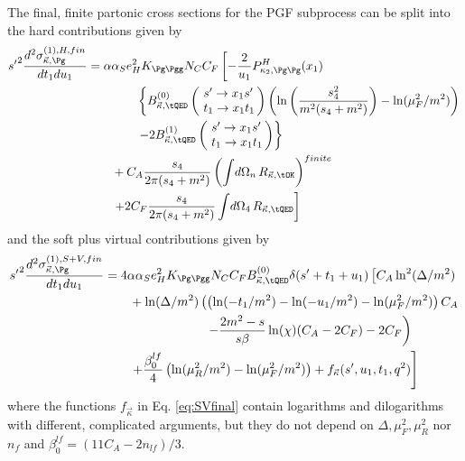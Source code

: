 The final, finite partonic cross sections for the PGF subprocess can be split into the hard contributions given by
\begin{align}
{s'}^2\frac{d^2\sigma_{\vec \kappa,\Pg}^{(1),H,fin}}{dt_1du_1} &=\alpha\alpha_Se_H^2K_{\Pg\Pgg}N_CC_F\left[-\frac 2 {u_1}P^H_{\kappa_2,\Pg\Pg}(x_1)\right. \nonumber\\
 &\hspace{40pt}\left\{ B^{(0)}_{\vec \kappa,\tQED}\left(\!\begin{array}{l}s'\rightarrow x_1s'\\t_1\rightarrow x_1 t_1\end{array}\!\!\right) \left(\ln\left(\frac{s_4^2}{m^2(s_4+m^2)}\right)-\ln(\mu_F^2/m^2)\right)\right. \nonumber\\
 &\hspace{40pt}\left.-2B^{(1)}_{\vec \kappa,\tQED}\left(\!\begin{array}{l}s'\rightarrow x_1s'\\t_1\rightarrow x_1 t_1\end{array}\!\!\right)\right\} \nonumber\\
 &\hspace{20pt}+C_A\frac{s_4}{2\pi(s_4+m^2)}\left(\int\!d\Omega_n\,R_{\vec \kappa,\tOK}\right)^{finite} \nonumber\\
 &\hspace{20pt}\left.+2C_F\frac{s_4}{2\pi(s_4+m^2)}\int\!d\Omega_4\,R_{\vec \kappa,\tQED}\right]
\end{align}
and the soft plus virtual contributions given by
\begin{align}
{s'}^2\frac{d^2\sigma_{\vec \kappa,\Pg}^{(1),S+V,fin}}{dt_1du_1} &=4\alpha\alpha_Se_H^2K_{\Pg\Pgg}N_CC_FB^{(0)}_{\vec \kappa,\tQED}\delta(s'+t_1+u_1)\left[C_A\ln^2(\Delta/m^2) \right.\nonumber\\
 &\hspace{20pt} + \ln(\Delta/m^2)\left(\left(\ln(-t_1/m^2)-\ln(-u_1/m^2)-\ln(\mu_F^2/m^2)\right)C_A \right. \nonumber\\
 &\hspace{80pt} \left. - \frac{2m^2-s}{s\beta}\ln(\chi)(C_A-2C_F) - 2C_F\right) \nonumber\\
 &\hspace{20pt}\left. + \frac {\beta_0^{lf}}{4}\left(\ln(\mu_R^2/m^2)- \ln(\mu_F^2/m^2)\right) +  f_{\vec \kappa}(s',u_1,t_1,q^2)\right] \label{eq:SVfinal}
\end{align}
where the functions $f_{\vec \kappa}$ in Eq. \ref{eq:SVfinal} contain logarithms and dilogarithms with different, complicated arguments, but they do not depend on $\Delta,\mu_F^2,\mu_R^2$ nor $n_f$ and $\beta_0^{lf} = (11C_A - 2n_{lf})/3$.

